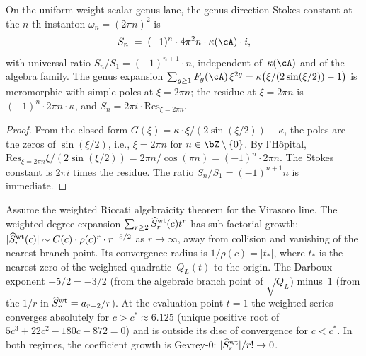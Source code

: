 \begin{proposition}%
\label{prop:universal-stokes-constants}%
%
%
On the uniform-weight scalar genus lane, the genus-direction Stokes
constant at the $n$-th instanton
$\omega_n = (2\pi n)^2$ is
\begin{equation}\label{eq:stokes-universal}
S_n \;=\; (-1)^n \cdot 4\pi^2 n \cdot \kappa(\cA) \cdot i,
\end{equation}
with universal ratio $S_n / S_1 = (-1)^{n+1} \cdot n$,
independent of~$\kappa(\cA)$ and of the algebra family.
The genus expansion
$\sum_{g \geq 1} F_g(\cA)\,\xi^{2g}
= \kappa\bigl(\xi/(2\sin(\xi/2)) - 1\bigr)$
is meromorphic with simple poles at $\xi = 2\pi n$;
the residue at $\xi = 2\pi n$ is
$(-1)^n \cdot 2\pi n \cdot \kappa$, and
$S_n = 2\pi i \cdot \mathrm{Res}_{\xi = 2\pi n}$.
\end{proposition}

\begin{proof}
From the closed form
$G(\xi) = \kappa\cdot\xi/(2\sin(\xi/2)) - \kappa$,
the poles are the zeros of $\sin(\xi/2)$, i.e.,
$\xi = 2\pi n$ for $n \in \bZ \setminus \{0\}$.
By l'H\^opital,
$\mathrm{Res}_{\xi=2\pi n} \xi/(2\sin(\xi/2))
= 2\pi n / \cos(\pi n) = (-1)^n \cdot 2\pi n$.
The Stokes constant is $2\pi i$ times the residue.
The ratio $S_n/S_1 = (-1)^{n+1} n$ is immediate.
\end{proof}

\begin{proposition}%
\label{prop:gevrey-zero-degree}%
%
%
Assume the weighted Riccati algebraicity theorem for the Virasoro
line. The weighted degree expansion
$\sum_{r \geq 2} \widehat S^{\rm wt}_r(c) t^r$ has sub-factorial
growth:
$|\widehat S^{\rm wt}_r(c)| \sim C(c) \cdot \rho(c)^r \cdot r^{-5/2}$
as $r \to \infty$, away from collision and vanishing of the nearest
branch point. Its convergence radius is
$1/\rho(c) = |t_*|$, where $t_*$ is the nearest zero
of the weighted quadratic~$Q_L(t)$ to the origin. The Darboux exponent
$-5/2 = -3/2$ \textup{(}from the algebraic branch point
of $\sqrt{Q_L}$\textup{)} minus~$1$
\textup{(}from the $1/r$ in
$\widehat S^{\rm wt}_r = a_{r-2}/r$\textup{)}.
At the evaluation point $t=1$ the weighted series converges absolutely for
$c > c^* \approx 6.125$
\textup{(}unique positive root of
$5c^3 + 22c^2 - 180c - 872 = 0$\textup{)} and is outside its
disc of convergence for $c < c^*$. In both regimes, the coefficient
growth is Gevrey-$0$:
$|\widehat S^{\rm wt}_r|/r! \to 0$.
\end{proposition}

